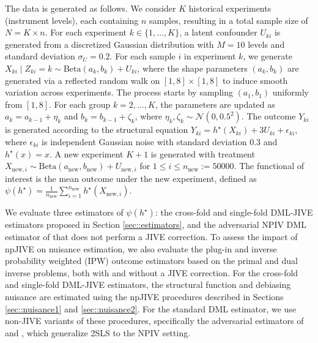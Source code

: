 \documentclass[11pt]{article}
\theoremstyle{plain}
\theoremstyle{definition}
\theoremstyle{remark}
\theoremstyle{definition}
\begin{document}
The data is generated as follows. We consider \( K \) historical experiments (instrument levels), each containing \( n \) samples, resulting in a total sample size of \( N = K \times n \). For each experiment \( k \in \{1, \ldots, K\} \), a latent confounder \( U_{ki} \) is generated from a discretized Gaussian distribution with \( M=10 \) levels and standard deviation \( \sigma_U = 0.2 \). For each sample \( i \) in experiment \( k \), we generate \( X_{ki} \mid Z_{ki} = k \sim \text{Beta}(a_k, b_k) + U_{ki} \), where the shape parameters \( (a_k, b_k) \) are generated via a reflected random walk on \( [1,8] \times [1,8] \) to induce smooth variation across experiments. The process starts by sampling \( (a_1, b_1) \) uniformly from \( [1, 8] \). For each group \( k = 2, \ldots, K \), the parameters are updated as \( a_k = a_{k-1} + \eta_k \) and \( b_k = b_{k-1} + \zeta_k \), where \( \eta_k, \zeta_k \sim \mathcal{N}(0, 0.5^2) \). The outcome \( Y_{ki} \) is generated according to the structural equation \( Y_{ki} = h^{\star}(X_{ki}) + 3 U_{ki} + \epsilon_{ki} \), where \( \epsilon_{ki} \) is independent Gaussian noise with standard deviation \( 0.3 \) and \( h^{\star}(x) = x \). A new experiment \( K+1 \) is generated with treatment \( X_{\text{new}, i} \sim \text{Beta}(a_{\text{new}}, b_{\text{new}}) + U_{\text{new}, i} \) for \( 1 \leq i \leq n_{\text{new}} := 50000 \). The functional of interest is the mean outcome under the new experiment, defined as 
\(
\psi(h^{\star}) = \frac{1}{n_{\text{new}}} \sum_{i=1}^{n_{\text{new}}} h^{\star}(X_{\text{new}, i}).
\)


We evaluate three estimators of \( \psi(h^{\star}) \): the cross-fold and single-fold DML-JIVE estimators proposed in Section \ref{sec::estimators}, and the adversarial NPIV DML estimator of \cite{bennett2023variational} that does not perform a JIVE correction. To assess the impact of npJIVE on nuisance estimation, we also evaluate the plug-in and inverse probability weighted (IPW) outcome estimators based on the primal and dual inverse problems, both with and without a JIVE correction. For the cross-fold and single-fold DML-JIVE estimators, the structural function and debiasing nuisance are estimated using the npJIVE procedures described in Sections \ref{sec::nuisance1} and \ref{sec::nuisance2}. For the standard DML estimator, we use non-JIVE variants of these procedures, specifically the adversarial estimators of \cite{bennett2023variational} and \cite{bennett2023inference}, which generalize 2SLS to the NPIV setting.
\end{document}
